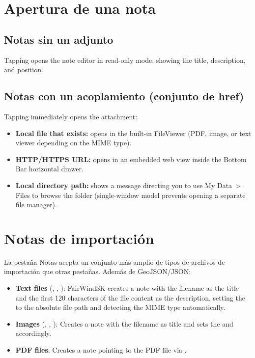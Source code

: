 \section{Apertura de una nota}

\subsection{Notas sin un adjunto}

Tapping  opens the note editor in read-only mode, showing the title, description, and position.

\subsection{Notas con un acoplamiento (conjunto de href)}

Tapping  immediately opens the attachment:

\begin{itemize}
  \item \textbf{Local file that exists:} opens in the built-in FileViewer (PDF, image, or text viewer depending on the MIME type).
  \item \textbf{HTTP/HTTPS URL:} opens in an embedded web view inside the Bottom Bar horizontal drawer.
  \item \textbf{Local directory path:} shows a message directing you to use My Data~> Files to browse the folder (single-window model prevents opening a separate file manager).
\end{itemize}

\section{Notas de importación}

La pestaña Notas acepta un conjunto más amplio de tipos de archivos de importación que otras pestañas.
Además de GeoJSON/JSON:

\begin{itemize}
  \item \textbf{Text files} (, , ): FairWindSK creates a note with the filename as the title and the first 120 characters of the file content as the description, setting the  to the absolute file path and detecting the MIME type automatically.
  \item \textbf{Images} (, , ): Creates a note with the filename as title and sets the  and  accordingly.
  \item \textbf{PDF files}: Creates a note pointing to the PDF file via .
\end{itemize}

